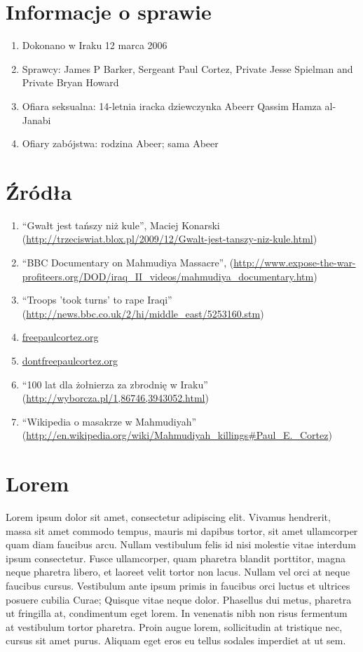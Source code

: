 \documentclass[12pt,a4paper]{article}
\begin{document}
\section{Informacje o sprawie}

\begin{enumerate}
\item Dokonano w Iraku 12 marca 2006
\item Sprawcy: James P Barker, Sergeant Paul Cortez, Private Jesse Spielman and Private Bryan Howard
\item Ofiara seksualna: 14-letnia iracka dziewczynka Abeerr Qassim Hamza al-Janabi
\item Ofiary zabójstwa: rodzina Abeer; sama Abeer
\end{enumerate}

\section{Źródła}


\begin{enumerate}
\item ``Gwałt jest tańszy niż kule'', Maciej Konarski (\url{http://trzeciswiat.blox.pl/2009/12/Gwalt-jest-tanszy-niz-kule.html})
\item ``BBC Documentary on Mahmudiya Massacre'',
  (\url{http://www.expose-the-war-profiteers.org/DOD/iraq_II_videos/mahmudiya_documentary.htm})
\item ``Troops 'took turns' to rape Iraqi'' (\url{http://news.bbc.co.uk/2/hi/middle_east/5253160.stm})
\item \url{freepaulcortez.org}
\item \url{dontfreepaulcortez.org}
\item ``100 lat dla żołnierza za zbrodnię w Iraku'' (\url{http://wyborcza.pl/1,86746,3943052.html})
\item ``Wikipedia o masakrze w Mahmudiyah'' (\url{http://en.wikipedia.org/wiki/Mahmudiyah_killings#Paul_E._Cortez})
\end{enumerate}

\section{Lorem}

Lorem ipsum dolor sit amet, consectetur adipiscing elit. Vivamus
hendrerit, massa sit amet commodo tempus, mauris mi dapibus tortor,
sit amet ullamcorper quam diam faucibus arcu. Nullam vestibulum felis
id nisi molestie vitae interdum ipsum consectetur. Fusce ullamcorper,
quam pharetra blandit porttitor, magna neque pharetra libero, et
laoreet velit tortor non lacus. Nullam vel orci at neque faucibus
cursus. Vestibulum ante ipsum primis in faucibus orci luctus et
ultrices posuere cubilia Curae; Quisque vitae neque dolor. Phasellus
dui metus, pharetra ut fringilla at, condimentum eget lorem. In
venenatis nibh non risus fermentum at vestibulum tortor pharetra.
Proin augue lorem, sollicitudin at tristique nec, cursus sit amet
purus. Aliquam eget eros eu tellus sodales imperdiet at ut sem.
\end{document}
